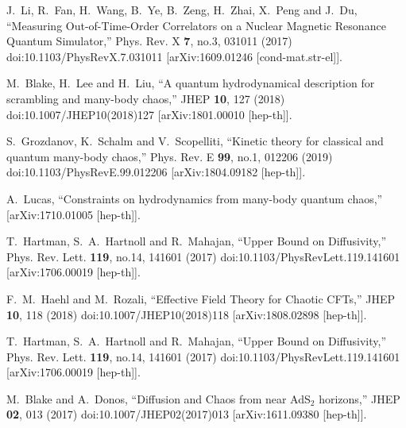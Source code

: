 \documentclass[preprintnumbers,aps,prd,longbibliography,nofootinbib,nobibnotes,amsmath,amssymb]{revtex4}
\begin{document}
\begin{thebibliography}{99}
J.~Li, R.~Fan, H.~Wang, B.~Ye, B.~Zeng, H.~Zhai, X.~Peng and J.~Du,
``Measuring Out-of-Time-Order Correlators on a Nuclear Magnetic Resonance Quantum Simulator,''
Phys. Rev. X \textbf{7}, no.3, 031011 (2017)
doi:10.1103/PhysRevX.7.031011
[arXiv:1609.01246 [cond-mat.str-el]].


M.~Blake, H.~Lee and H.~Liu,
``A quantum hydrodynamical description for scrambling and many-body chaos,''
JHEP \textbf{10}, 127 (2018)
doi:10.1007/JHEP10(2018)127
[arXiv:1801.00010 [hep-th]].

S.~Grozdanov, K.~Schalm and V.~Scopelliti,
``Kinetic theory for classical and quantum many-body chaos,''
Phys. Rev. E \textbf{99}, no.1, 012206 (2019)
doi:10.1103/PhysRevE.99.012206
[arXiv:1804.09182 [hep-th]].

A.~Lucas,
``Constraints on hydrodynamics from many-body quantum chaos,''
[arXiv:1710.01005 [hep-th]].

T.~Hartman, S.~A.~Hartnoll and R.~Mahajan,
``Upper Bound on Diffusivity,''
Phys. Rev. Lett. \textbf{119}, no.14, 141601 (2017)
doi:10.1103/PhysRevLett.119.141601
[arXiv:1706.00019 [hep-th]].

F.~M.~Haehl and M.~Rozali,
``Effective Field Theory for Chaotic CFTs,''
JHEP \textbf{10}, 118 (2018)
doi:10.1007/JHEP10(2018)118
[arXiv:1808.02898 [hep-th]].

T.~Hartman, S.~A.~Hartnoll and R.~Mahajan,
``Upper Bound on Diffusivity,''
Phys. Rev. Lett. \textbf{119}, no.14, 141601 (2017)
doi:10.1103/PhysRevLett.119.141601
[arXiv:1706.00019 [hep-th]].






M.~Blake and A.~Donos,
``Diffusion and Chaos from near AdS$_2$ horizons,''
JHEP \textbf{02}, 013 (2017)
doi:10.1007/JHEP02(2017)013
[arXiv:1611.09380 [hep-th]].


\end{thebibliography}
\end{document}
